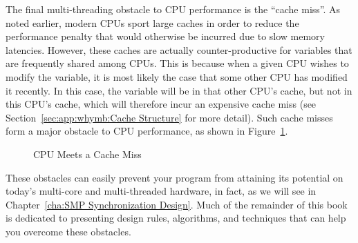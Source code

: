 The final multi-threading obstacle to CPU performance is the ``cache miss''.
As noted earlier, modern CPUs sport large caches in order to reduce the
performance penalty that would otherwise be incurred due to slow memory
latencies.
However, these caches are actually counter-productive for variables that
are frequently shared among CPUs.
This is because when a given CPU wishes to modify the variable, it is
most likely the case that some other CPU has modified it recently.
In this case, the variable will be in that other CPU's cache, but not
in this CPU's cache, which will therefore incur an expensive cache miss
(see Section~\ref{sec:app:whymb:Cache Structure} for more detail).
Such cache misses form a major obstacle to CPU performance, as shown
in Figure~\ref{fig:cpu:CPU Meets a Cache Miss}.

\begin{figure}[htb]
\begin{center}
\end{center}
\caption{CPU Meets a Cache Miss}
\label{fig:cpu:CPU Meets a Cache Miss}
\end{figure}

These obstacles can easily prevent your program from attaining its
potential on today's multi-core and multi-threaded hardware,
in fact, as we will see in Chapter~\ref{cha:SMP Synchronization Design}.
Much of the remainder of this book is dedicated to presenting
design rules, algorithms, and techniques that can help you
overcome these obstacles.
